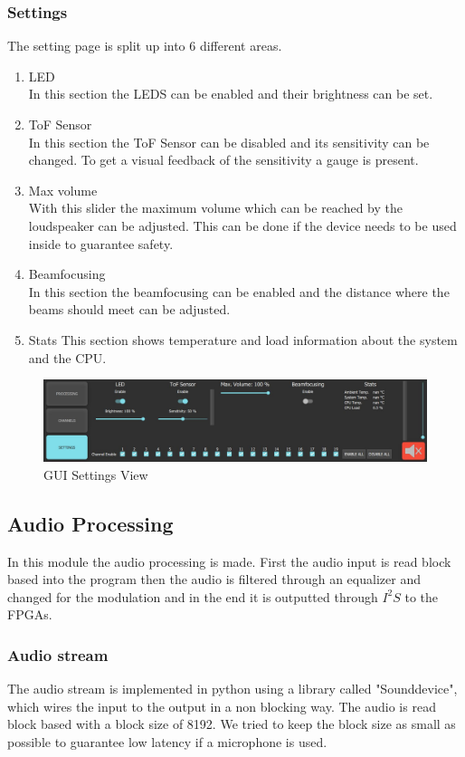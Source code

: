 \subsubsection{Settings}
The setting page is split up into 6 different areas.
\begin{enumerate}
    \item LED \\
    In this section the LEDS can be enabled and their brightness can be set. 
    \item ToF Sensor \\
    In this section the ToF Sensor can be disabled and its sensitivity can be changed. To get a visual feedback of the sensitivity a gauge is present.
    \item Max volume \\
    With this slider the maximum volume which can be reached by the loudspeaker can be adjusted. This can be done if the device needs to be used inside to guarantee safety.  
    \item Beamfocusing \\ 
    In this section the beamfocusing can be enabled and the distance where the beams should meet can be adjusted. 
    \item Stats
    This section shows temperature and load information about the system and the CPU.
\end{enumerate}
\begin{figure}[h!]
    \centering
    \includegraphics[width=\textwidth]{images/4_Design/GUI_Settings.JPG}
    \caption{GUI Settings View}
    \label{4_fig:gui_settings}
\end{figure}

\subsection{Audio Processing}
In this module the audio processing is made. First the audio input is read block based into the program then the audio is filtered through an equalizer and changed for the modulation and in the end it is outputted through $I^2S$ to the FPGAs.
\subsubsection{Audio stream}
The audio stream is implemented in python using a library called "Sounddevice", which wires the input to the output in a non blocking way. The audio is read block based with a block size of 8192. We tried to keep the block size as small as possible to guarantee low latency if a microphone is used. 
